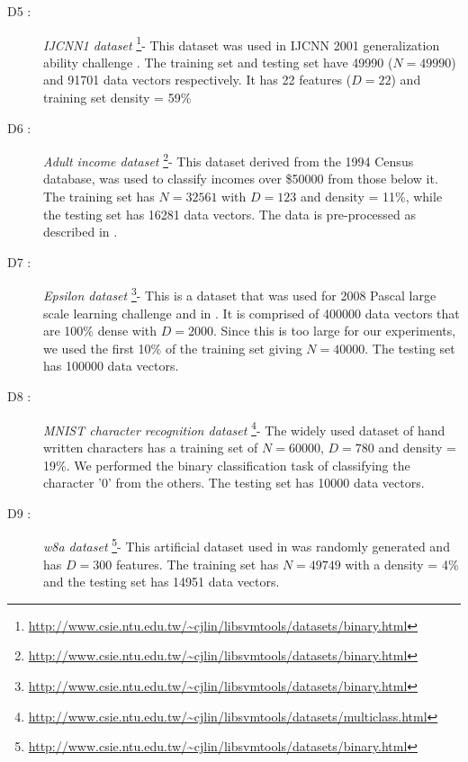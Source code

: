 \documentclass[twoside]{article}
\begin{document}
\begin{description}
\item[D5 :] {\it IJCNN1 dataset} \footnote{\url{http://www.csie.ntu.edu.tw/~cjlin/libsvmtools/datasets/binary.html}}- This dataset was used in IJCNN 2001 generalization ability challenge \citep{Chang01}. The training set and testing set have 49990 ($N = 49990$) and 91701 data vectors respectively. It has 22 features ($D = 22$) and training set density = 59\%

\item[D6 :] {\it Adult income dataset} \footnote{\url{http://www.csie.ntu.edu.tw/~cjlin/libsvmtools/datasets/binary.html}}- This dataset derived from the 1994 Census database, was used to classify incomes over \$50000 from those below it. The training set has $N = 32561$ with $D = 123$ and density = 11\%, while the testing set has 16281 data vectors. The data is pre-processed as described in \citet{Platt99}.

\item[D7 :] {\it Epsilon dataset} \footnote{\url{http://www.csie.ntu.edu.tw/~cjlin/libsvmtools/datasets/binary.html}}- This is a dataset that was used for 2008 Pascal large scale learning challenge and in \citet{Yuan11}. It is comprised of 400000 data vectors that are 100\% dense with $D = 2000$. Since this is too large for our experiments, we used the first 10\% of the training set giving $N = 40000$. The testing set has 100000 data vectors.

\item[D8 :] {\it MNIST character recognition dataset} \footnote{\url{http://www.csie.ntu.edu.tw/~cjlin/libsvmtools/datasets/multiclass.html}}- The widely used dataset \citep{Lecun98} of hand written characters has a training set of $N = 60000$, $D = 780$ and density = 19\%. We performed the binary classification task of classifying the character '0' from the others. The testing set has 10000 data vectors.

\item[D9 :] {\it w8a dataset} \footnote{\url{http://www.csie.ntu.edu.tw/~cjlin/libsvmtools/datasets/binary.html}}- This artificial dataset used in \citet{Platt99} was randomly generated and has $D = 300$ features. The training set has $N = 49749$ with a density = 4\% and the testing set has 14951 data vectors.

\end{description}
\end{document}
